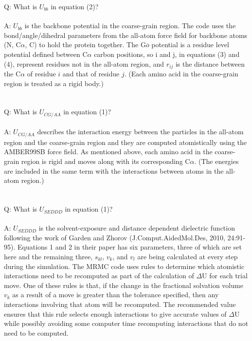 \documentclass{article}      %
\begin{document}
Q:  What is $U_{bb}$ in equation (2)?
\\\\
A: $U_{bb}$ is the backbone potential in the coarse-grain region. The code uses the bond/angle/dihedral parameters from the all-atom force field for backbone atoms (N, C$\alpha$, C) to hold the protein together. The G$\overline{o}$ potential is a residue level potential defined between C$\alpha$ carbon positions, so i and j, in equations (3) and (4), represent residues not in the all-atom region, and $r_{ij}$ is the distance between the C$\alpha$ of residue $i$ and that of residue $j$.  (Each amino acid in the coarse-grain region is treated as a rigid body.)
\\\\\\
Q:  What is $U_{CG/AA}$ in equation (1)?
\\\\
A:  $U_{CG/AA}$ describes the interaction energy between the particles in the all-atom region and the coarse-grain region and they are computed atomistically using the AMBER99SB force field.  As mentioned above, each amino acid in the coarse-grain region is rigid and moves along with its corresponding C$\alpha$. (The energies are included in the same term with the interactions between atoms in the all-atom region.)
\\\\\\
Q:  What is $U_{SEDDD}$ in equation (1)?
\\\\
A:  $U_{SEDDD}$ is the solvent-exposure and distance dependent dielectric function following the work of Garden and Zhorov (J.Comput.AidedMol.Des, 2010, 24:91-95). Equations 1 and 2 in their paper has six parameters, three of which are set here and the remaining three, $s_{kl}$, $v_{k}$, and $v_{l}$ are being calculated at every step during the simulation. The MRMC code uses rules to determine which atomistic interactions need to be recomputed as part of the calculation of $\Delta$U for each trial move. One of these rules is that, if the change in the fractional solvation volume $v_{k}$ as a result of a move is greater than the tolerance specified, then any interactions involving that atom will be recomputed. The recommended value ensures that this rule selects enough interactions to give accurate values of $\Delta$U while possibly avoiding some computer time recomputing interactions that do not need to be computed.
\\\\\\
\end{document}
